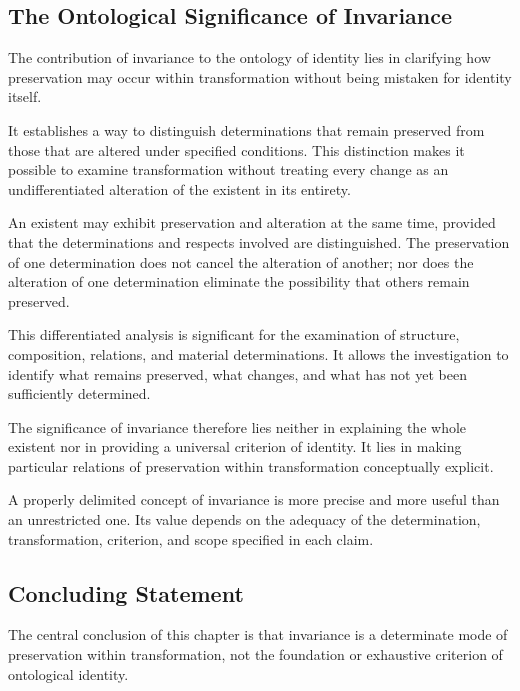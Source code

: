 \subsection{The Ontological Significance of Invariance}

The contribution of invariance to the ontology
of identity lies in clarifying how preservation
may occur within transformation without being
mistaken for identity itself.

It establishes a way to distinguish determinations
that remain preserved from those that are altered
under specified conditions. This distinction makes
it possible to examine transformation without
treating every change as an undifferentiated
alteration of the existent in its entirety.

An existent may exhibit preservation and alteration
at the same time, provided that the determinations
and respects involved are distinguished. The
preservation of one determination does not cancel
the alteration of another; nor does the alteration
of one determination eliminate the possibility
that others remain preserved.



This differentiated analysis is significant for
the examination of structure, composition, relations,
and material determinations. It allows the
investigation to identify what remains preserved,
what changes, and what has not yet been sufficiently
determined.

The significance of invariance therefore lies
neither in explaining the whole existent nor in
providing a universal criterion of identity. It
lies in making particular relations of preservation
within transformation conceptually explicit.

A properly delimited concept of invariance is
more precise and more useful than an unrestricted
one. Its value depends on the adequacy of the
determination, transformation, criterion, and
scope specified in each claim.

\subsection{Concluding Statement}

The central conclusion of this chapter is that
invariance is a determinate mode of preservation
within transformation, not the foundation or
exhaustive criterion of ontological identity.

